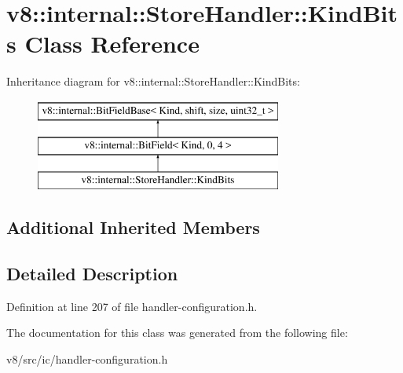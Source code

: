\hypertarget{classv8_1_1internal_1_1StoreHandler_1_1KindBits}{}\section{v8\+:\+:internal\+:\+:Store\+Handler\+:\+:Kind\+Bits Class Reference}
\label{classv8_1_1internal_1_1StoreHandler_1_1KindBits}
Inheritance diagram for v8\+:\+:internal\+:\+:Store\+Handler\+:\+:Kind\+Bits\+:\begin{figure}[H]
\begin{center}
\leavevmode
\includegraphics[height=3.000000cm]{classv8_1_1internal_1_1StoreHandler_1_1KindBits}
\end{center}
\end{figure}
\subsection*{Additional Inherited Members}


\subsection{Detailed Description}


Definition at line 207 of file handler-\/configuration.\+h.



The documentation for this class was generated from the following file\+:\begin{DoxyCompactItemize}
\item 
v8/src/ic/handler-\/configuration.\+h\end{DoxyCompactItemize}

